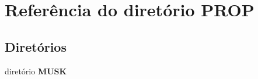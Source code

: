 \section{Referência do diretório P\+R\+OP}
\label{dir_42b9879b56b2fb75fd30cd89f70c386c}
\subsection*{Diretórios}
\begin{DoxyCompactItemize}
\item 
diretório {\bf M\+U\+SK}
\end{DoxyCompactItemize}
